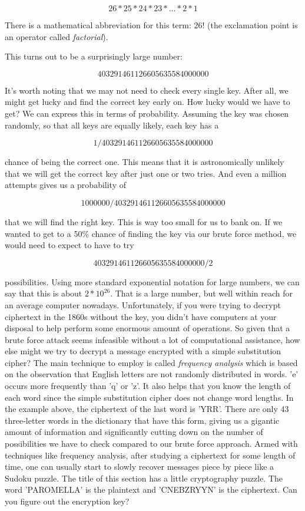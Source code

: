 \documentclass[UTF8]{book}
\begin{document}
\begin{CJK}{UTF8}{gbsn}
\[ 26*25*24*23* … * 2 * 1 \]

There is a mathematical abbreviation for this term: 26! (the exclamation point is an operator called \emph{factorial}).

This turns out to be a surprisingly large number:

\[ 403291461126605635584000000 \]

It's worth noting that we may not need to check every single key. After all, we might get lucky and find the correct key early on. How lucky would we have to get? We can express this in terms of probability. Assuming the key was chosen randomly, so that all keys are equally likely, each key has a

\[ 1/403291461126605635584000000 \]

chance of being the correct one. This means that it is astronomically unlikely that we will get the correct key after just one or two tries. And even a million attempts gives us a probability of

\[ 1000000/403291461126605635584000000 \]

that we will find the right key. This is way too small for us to bank on. If we wanted to get to a 50\% chance of finding the key via our brute force method, we would need to expect to have to try

\[ 403291461126605635584000000/2 \]

possibilities. Using more standard exponential notation for large numbers, we can say that this is about $2*10^{26}$. That is a large number, but well within reach for an average computer nowadays. Unfortunately, if you were trying to decrypt ciphertext in the 1860s without the key, you didn't have computers at your disposal to help perform some enormous amount of operations. So given that a brute force attack seems infeasible without a lot of computational assistance, how else might we try to decrypt a message encrypted with a simple substitution cipher? The main technique to employ is called \emph{frequency analysis} which is based on the observation that English letters are not randomly distributed in words. 'e' occurs more frequently than 'q' or 'z'. It also helps that you know the length of each word since the simple substitution cipher does not change word lengths. In the example above, the ciphertext of the last word is 'YRR'. There are only 43 three-letter words in the dictionary that have this form, giving us a gigantic amount of information and significantly cutting down on the number of possibilities we have to check compared to our brute force approach. Armed with techniques like frequency analysis, after studying a ciphertext for some length of time, one can usually start to slowly recover messages piece by piece like a Sudoku puzzle. The title of this section has a little cryptography puzzle. The word 'PAROMELLA' is the plaintext and 'CNEBZRYYN' is the ciphertext. Can you figure out the encryption key?


\end{CJK}
\end{document}
